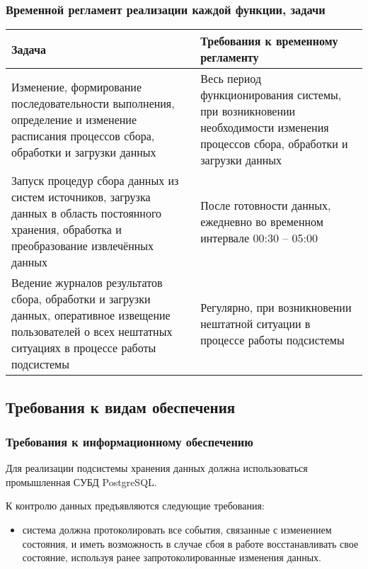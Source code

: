 \documentclass[a4paper, 14pt]{extarticle}
\begin{document}
\subsubsection{Временной регламент реализации каждой функции, задачи}

\begin{longtable}{|L{0.48\textwidth}|L{0.48\textwidth}|}
  \hline
  \textbf{Задача}                                                     &
  \textbf{Требования к временному регламенту}                              \\
  \hline
  Изменение, формирование последовательности выполнения, определение и изменение
  расписания процессов сбора, обработки и загрузки данных             &
  Весь период функционирования системы, при возникновении необходимости
  изменения процессов сбора, обработки и загрузки данных                   \\
  \hline
  Запуск процедур сбора данных из систем источников, загрузка данных в область
  постоянного хранения, обработка и преобразование извлечённых данных &
  После готовности данных, ежедневно во временном интервале 00:30 -- 05:00 \\
  \hline
  Ведение журналов результатов сбора, обработки и загрузки данных, оперативное
  извещение пользователей о всех нештатных ситуациях в процессе работы
  подсистемы                                                          &
  Регулярно, при возникновении нештатной ситуации в процессе работы подсистемы
  \\
  \hline
\end{longtable}

\subsection{Требования к видам обеспечения}

\subsubsection{Требования к информационному обеспечению}

Для реализации подсистемы хранения данных должна использоваться промышленная
СУБД PostgreSQL.

К контролю данных предъявляются следующие требования:
\begin{itemize}
  \item система должна протоколировать все события, связанные с изменением
  состояния, и иметь возможность в случае сбоя в работе восстанавливать свое
  состояние, используя ранее запротоколированные изменения данных.
\end{itemize}
\end{document}
